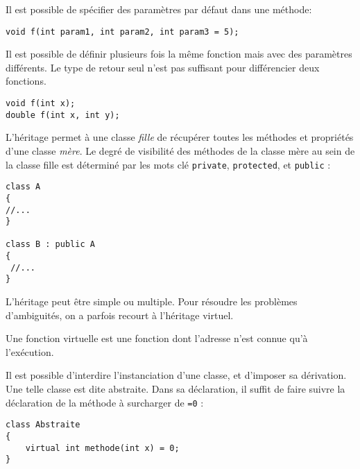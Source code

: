 \begin{recapitulatif}
\item Il est possible de sp\'ecifier des param\`etres par d\'efaut dans une m\'ethode:
\begin{lstlisting}
void f(int param1, int param2, int param3 = 5);
\end{lstlisting}

\item Il est possible de d\'efinir plusieurs fois la m\^eme fonction mais avec des param\`etres diff\'erents. Le type de retour seul n'est pas suffisant pour
diff\'erencier deux fonctions.
\begin{lstlisting}
void f(int x);
double f(int x, int y);
\end{lstlisting}

\item L'h\'eritage permet \`a une classe \emph{fille} de r\'ecup\'erer toutes les m\'ethodes et propri\'et\'es d'une classe \emph{m\`ere}. Le degr\'e de visibilit\'e
des m\'ethodes de la classe m\`ere au sein de la classe fille est d\'etermin\'e par les mots cl\'e \texttt{private}, \texttt{protected}, et \texttt{public} :
\begin{lstlisting}
class A
{
//...
}

class B : public A
{
 //...
}

\end{lstlisting}

\item L'h\'eritage peut \^etre simple ou multiple. Pour r\'esoudre les probl\`emes d'ambiguit\'es, on a parfois recourt \`a l'h\'eritage virtuel.

\item Une fonction virtuelle est une fonction dont l'adresse n'est connue qu'\`a l'ex\'ecution.

\item Il est possible d'interdire l'instanciation d'une classe, et d'imposer sa d\'erivation. Une telle classe est dite abstraite. Dans sa d\'eclaration, il suffit
de faire suivre la d\'eclaration de la m\'ethode \`a surcharger de \texttt{=0} :
\begin{lstlisting}
class Abstraite
{
    virtual int methode(int x) = 0;
}

\end{lstlisting}
\end{recapitulatif}
